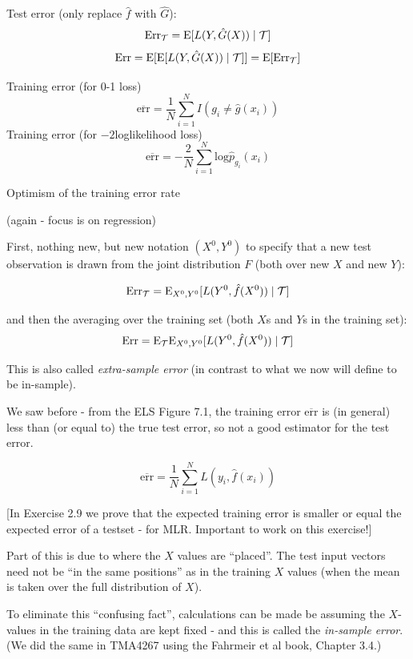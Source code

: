 \documentclass[
  ignorenonframetext,
]{beamer}
\begin{document}
\begin{frame}

Test error (only replace \(\hat{f}\) with \(\hat{G}\)):
\[ \text{Err}_{\cal T}=\text{E}[L(Y,\hat{G}(X))\mid {\cal T}]\]
\[ \text{Err}=\text{E}[\text{E}[L(Y,\hat{G}(X))\mid {\cal T}]]=\text{E} [\text{Err}_{\cal T}]\]

Training error (for 0-1 loss)
\[\overline{\text{err}}=\frac{1}{N}\sum_{i=1}^N I(g_i\neq \hat{g}(x_i))\]
Training error (for \(-2\)loglikelihood loss)
\[\overline{\text{err}}=-\frac{2}{N}\sum_{i=1}^N \text{log}\hat{p}_{g_i}(x_i)\]

\end{frame}

\begin{frame}

\begin{block}{Optimism of the training error rate}

(again - focus is on regression)

First, nothing new, but new notation \((X^0,Y^0)\) to specify that a new
test observation is drawn from the joint distribution \(F\) (both over
new \(X\) and new \(Y\)):

\[\text{Err}_{\cal T}=\text{E}_{X^0,Y^0}[L(Y^0,\hat{f}(X^0))\mid {\cal T}]\]

and then the averaging over the training set (both \(X\)s and \(Y\)s in
the training set):
\[\text{Err}=\text{E}_{\cal T} \text{E}_{X^0,Y^0}[L(Y^0,\hat{f}(X^0))\mid {\cal T}]\]

This is also called \emph{extra-sample error} (in contrast to what we
now will define to be in-sample).

\end{block}

\end{frame}

\begin{frame}

We saw before - from the ELS Figure 7.1, the training error
\(\overline{\text{err}}\) is (in general) less than (or equal to) the
true test error, so not a good estimator for the test error.

\[\overline{\text{err}}=\frac{1}{N} \sum_{i=1}^N L(y_i,\hat{f}(x_i))\]

{[}In Exercise 2.9 we prove that the expected training error is smaller
or equal the expected error of a testset - for MLR. Important to work on
this exercise!{]}

Part of this is due to where the \(X\) values are ``placed''. The test
input vectors need not be ``in the same positions'' as in the training
\(X\) values (when the mean is taken over the full distribution of
\(X\)).

To eliminate this ``confusing fact'', calculations can be made be
assuming the \(X\)-values in the training data are kept fixed - and this
is called the \emph{in-sample error}. (We did the same in TMA4267 using
the Fahrmeir et al book, Chapter 3.4.)

\end{frame}
\end{document}
